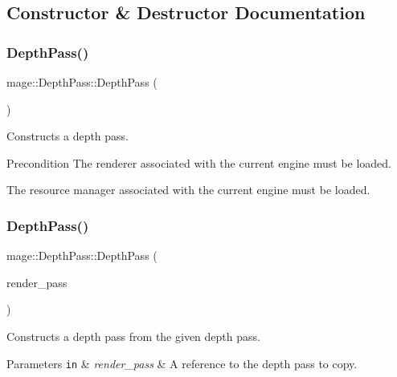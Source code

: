 \subsection{Constructor \& Destructor Documentation}
\hypertarget{classmage_1_1_depth_pass_a16a23f6820a11faf9195b307474e355b}{}\label{classmage_1_1_depth_pass_a16a23f6820a11faf9195b307474e355b} 
\subsubsection{\texorpdfstring{Depth\+Pass()}{DepthPass()}\hspace{0.1cm}{\footnotesize\ttfamily [1/3]}}
{\footnotesize\ttfamily mage\+::\+Depth\+Pass\+::\+Depth\+Pass (\begin{DoxyParamCaption}{ }\end{DoxyParamCaption})}

Constructs a depth pass.

\begin{DoxyPrecond}{Precondition}
The renderer associated with the current engine must be loaded. 

The resource manager associated with the current engine must be loaded. 
\end{DoxyPrecond}
\hypertarget{classmage_1_1_depth_pass_a9f0376b1423404dcced29535d59dd18c}{}\label{classmage_1_1_depth_pass_a9f0376b1423404dcced29535d59dd18c} 
\subsubsection{\texorpdfstring{Depth\+Pass()}{DepthPass()}\hspace{0.1cm}{\footnotesize\ttfamily [2/3]}}
{\footnotesize\ttfamily mage\+::\+Depth\+Pass\+::\+Depth\+Pass (\begin{DoxyParamCaption}\item[{const \hyperlink{classmage_1_1_depth_pass}{Depth\+Pass} \&}]{render\+\_\+pass }\end{DoxyParamCaption})\hspace{0.3cm}{\ttfamily [delete]}}

Constructs a depth pass from the given depth pass.


\begin{DoxyParams}[1]{Parameters}
\mbox{\tt in}  & {\em render\+\_\+pass} & A reference to the depth pass to copy. \\
\hline
\end{DoxyParams}
\hypertarget{classmage_1_1_depth_pass_af5755a8ee09bc528c0644f657558d71f}{}\label{classmage_1_1_depth_pass_af5755a8ee09bc528c0644f657558d71f} 
